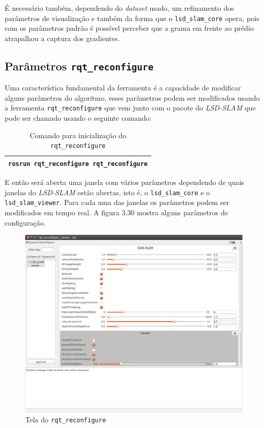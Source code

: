 É necessário também, dependendo do \textit{dataset} usado, um refinamento dos parâmetros de visualização e também da forma que o \texttt{lsd\_slam\_core} opera, pois com os parâmetros padrão é possível perceber que a grama em frente ao prédio atrapalhou a captura dos gradientes.

\subsection{Parâmetros \texttt{rqt\_reconfigure}}

Uma característica fundamental da ferramenta é a capacidade de modificar alguns parâmetros do algoritmo, esses parâmetros podem ser modificados usando a ferramenta \texttt{rqt\_reconfigure} que vem junto com o pacote do \textit{LSD-SLAM} que pode ser chamado usando o seguinte comando:

\begin{table}[H]\label{tb:17}
\begin{tabular}{| p{\textwidth}|}
\hline
\texttt{rosrun rqt\_reconfigure rqt\_reconfigure}\\
\hline
\end{tabular}
\caption{Comando para inicialização do \texttt{rqt\_reconfigure}}
\end{table}

E então será aberta uma janela com vários parâmetros dependendo de quais janelas do \textit{LSD-SLAM} estão abertas, isto é, o \texttt{lsd\_slam\_core} e o \texttt{lsd\_slam\_viewer}. Para cada uma das janelas os parâmetros podem ser modificados em tempo real. A figura 3.30 mostra alguns parâmetros de configuração.

\begin{figure}[H]
	\centering
		\includegraphics[width= \textwidth]{Imagens/figura3-30.png}
	\caption{Tela do \texttt{rqt\_reconfigure}}
	\label{fig3:28}
\end{figure}



